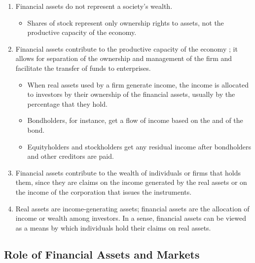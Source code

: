 \documentclass[notoc,notitlepage]{tufte-book}
\begin{document}
\begin{remark}
  \begin{enumerate}
    \item Financial assets do not represent a society's wealth.
      \begin{itemize}
        \item Shares of stock represent only ownership rights to assets,
          not the productive capacity of the economy.
      \end{itemize}
    \item Financial assets contribute to the productive capacity of the economy
      ; it allows for separation of the ownership and
      management of the firm and facilitate the transfer of funds to
      enterprises.
      \begin{itemize}
        \item When real assets used by a firm generate income,
          the income is allocated to investors by their ownership of the
          financial assets, usually by the percentage that they hold.
        \item Bondholders, for instance, get a flow of income
          based on the  and 
          of the bond.
        \item Equityholders and stockholders get any residual income
          after bondholders and other creditors are paid.
      \end{itemize}
    \item Financial assets contribute to the wealth of individuals or firms
      that holds them, since they are claims on the income generated by
      the real assets or on the income of the corporation that issues
      the instruments.
    \item Real assets are income-generating assets;
      financial assets are the allocation of income or wealth among investors.
      In a sense, financial assets can be viewed as a means by which
      individuals hold their claims on real assets.
  \end{enumerate}
\end{remark}


\subsection{Role of Financial Assets and Markets}%
\label{sub:role_of_financial_assets_and_markets}
\end{document}

